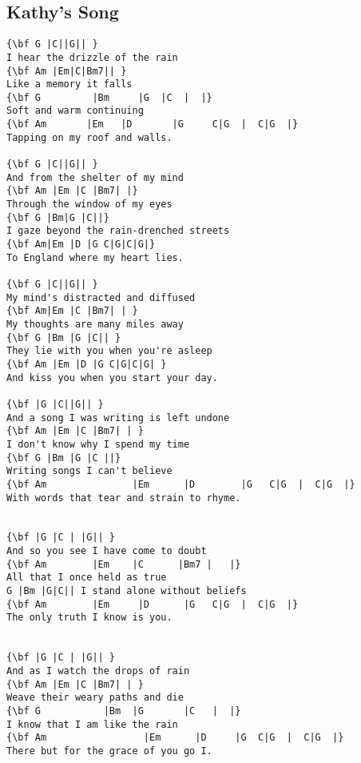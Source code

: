 \documentclass[a4paper]{article}
\begin{document}
\subsection{Kathy's Song} %
\label{sub:Kathy's Song}
\begin{Verbatim}[commandchars=\\\{\}]
{\bf G |C||G|| }
I hear the drizzle of the rain
{\bf Am |Em|C|Bm7|| }
Like a memory it falls
{\bf G         |Bm     |G  |C  |  |}
Soft and warm continuing
{\bf Am       |Em   |D       |G     C|G  |  C|G  |}
Tapping on my roof and walls.

{\bf G |C||G|| }
And from the shelter of my mind
{\bf Am |Em |C |Bm7| |}
Through the window of my eyes
{\bf G |Bm|G |C||}
I gaze beyond the rain-drenched streets 
{\bf Am|Em |D |G C|G|C|G|}
To England where my heart lies.

{\bf G |C||G|| }
My mind's distracted and diffused
{\bf Am|Em |C |Bm7| | }
My thoughts are many miles away
{\bf G |Bm |G |C|| }
They lie with you when you're asleep
{\bf Am |Em |D |G C|G|C|G| }
And kiss you when you start your day.

{\bf |G |C||G|| }
And a song I was writing is left undone
{\bf Am |Em |C |Bm7| | }
I don't know why I spend my time
{\bf G |Bm |G |C ||}
Writing songs I can't believe
{\bf Am               |Em      |D        |G   C|G  |  C|G  |}
With words that tear and strain to rhyme.


{\bf |G |C | |G|| }
And so you see I have come to doubt
{\bf Am        |Em    |C      |Bm7 |   |}
All that I once held as true
G |Bm |G|C|| I stand alone without beliefs
{\bf Am        |Em     |D      |G   C|G  |  C|G  |}
The only truth I know is you.


{\bf |G |C | |G|| }
And as I watch the drops of rain
{\bf Am |Em |C |Bm7| | }
Weave their weary paths and die
{\bf G           |Bm  |G       |C   |  |}
I know that I am like the rain
{\bf Am                 |Em      |D     |G  C|G  |  C|G  |}
There but for the grace of you go I.
\end{Verbatim}
\newpage
\end{document}
